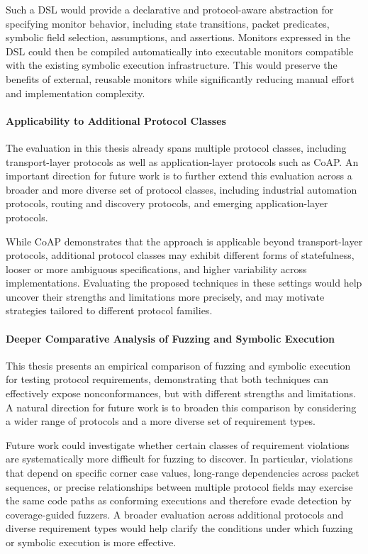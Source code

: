 Such a DSL would provide a declarative and protocol-aware abstraction for specifying monitor behavior, including state transitions, packet predicates, symbolic field selection, assumptions, and assertions.
Monitors expressed in the DSL could then be compiled automatically into executable monitors compatible with the existing symbolic execution infrastructure. This would preserve the benefits of external, reusable monitors while significantly reducing manual effort and implementation complexity.

\paragraph{Applicability to Additional Protocol Classes}
The evaluation in this thesis already spans multiple protocol classes, including transport-layer protocols as well as application-layer protocols such as CoAP.
An important direction for future work is to further extend this evaluation across a broader and more diverse set of protocol classes, including industrial automation protocols, routing and discovery protocols, and emerging application-layer protocols.

While CoAP demonstrates that the approach is applicable beyond transport-layer protocols, additional protocol classes may exhibit different forms of statefulness, looser or more ambiguous specifications, and higher variability across implementations.
Evaluating the proposed techniques in these settings would help uncover their strengths and limitations more precisely, and may motivate strategies tailored to different protocol families.

\paragraph{Deeper Comparative Analysis of Fuzzing and Symbolic Execution}
This thesis presents an empirical comparison of fuzzing and symbolic execution for testing protocol requirements, demonstrating that both techniques can effectively expose nonconformances, but with different strengths and limitations.
A natural direction for future work is to broaden this comparison by considering a wider range of protocols and a more diverse set of requirement types.

Future work could investigate whether certain classes of requirement violations are systematically more difficult for fuzzing to discover.
In particular, violations that depend on specific corner case values, long-range dependencies across packet sequences, or precise relationships between multiple protocol fields may exercise the same code paths as conforming executions and therefore evade detection by coverage-guided fuzzers.
A broader evaluation across additional protocols and diverse requirement types would help clarify the conditions under which fuzzing or symbolic execution is more effective.

